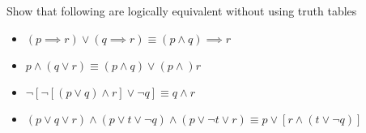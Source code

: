 \documentclass[addpoints]{exam}
\newenvironment{problem}[2][Problem]{\begin{trivlist}
    \item[\hskip \labelsep {\bfseries #1}\hskip \labelsep {\bfseries #2.}]}{\end{trivlist}}
\begin{document}
\begin{sloppypar}
\begin{questions}
    \question
    \begin{solution}

        
    \end{solution}
\end{questions}

\begin{problem}{7}
Show that following are logically equivalent without using truth tables
\begin{itemize}
    \item[(a)] $ (p \implies r) \lor (q \implies r)  \equiv  (p \land q) \implies r $
    \item[(b)] $ p \land (q \lor r) \equiv (p \land q) \lor (p \land) r $
    \item[(c)] $ \neg [\neg[(p \lor q) \land r] \lor \neg q] \equiv q \land r $
        \item[(d)]$ (p \lor q \lor r) \land (p \lor t \lor \neg q) \land (p \lor \neg t \lor r) \equiv p \lor [r \land (t \lor \neg q)] $
\end{itemize}


\end{problem}
\end{sloppypar}
\end{document}

